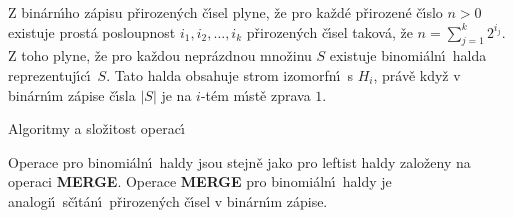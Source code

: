 \documentclass[a4paper,12pt]{article}
\begin{document}
\flushpar Z bin\'arn\'\i ho z\'apisu p\v rirozen\'ych \v c\'\i sel plyne, \v ze 
pro ka\v zd\'e p\v riro\-ze\-n\'e \v c\'\i slo $n>0$ existuje prost\'a 
posloupnost $i_1,i_2,\dots,i_k$ p\v riro\-ze\-n\'ych \v c\'\i sel takov\'a, \v ze 
$n=\sum_{j=1}^k2^{i_j}$. Z toho plyne, \v ze pro ka\v zdou nepr\'azd\-nou 
mno\v zinu $S$ existuje binomi\'aln\'\i\ halda repre\-zentuj\'\i c\'\i\ $
S$.
Tato halda obsahuje strom izomorfn\'\i\ s $H_i$, pr\'av\v e kdy\v z v 
bin\'arn\'\i m z\'apise \v c\'\i sla $|S|$ je na $i$-t\'em m\'\i st\v e zprava $
1$.
\bigskip

\head
Algoritmy a slo\v zitost operac\'\i
\endhead

\flushpar Operace pro binomi\'aln\'\i\ haldy jsou  
stejn\v e jako pro leftist haldy zalo\v zeny na ope\-raci {\bf MER\-GE}. Ope\-race 
{\bf MERGE} pro binomi\'aln\'\i\ haldy je analogi\'\i\ s\v c\'\i t\'an\'\i\ 
p\v rirozen\'ych \v c\'\i sel v bin\'ar\-n\'\i m z\'apise.
\bigskip
\end{document}
